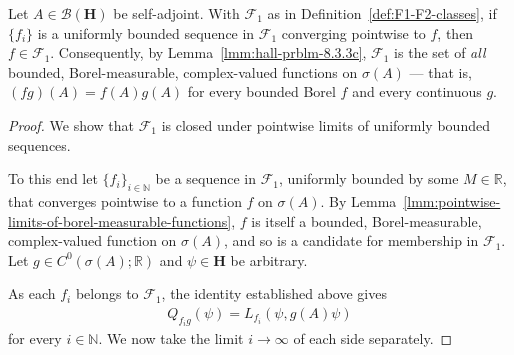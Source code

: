 \begin{proposition}
    \label{prpstn:F1-closed-under-limits}
    \leanok
    Let $A \in \mathcal{B}(\mathbf{H})$ be self-adjoint. With $\mathcal{F}_1$ as in Definition~\ref{def:F1-F2-classes}, if $\{f_i\}$ is a uniformly bounded sequence in $\mathcal{F}_1$ converging pointwise to $f$, then $f \in \mathcal{F}_1$. Consequently, by Lemma~\ref{lmm:hall-prblm-8.3.3c}, $\mathcal{F}_1$ is the set of \textit{all} bounded, Borel-measurable, complex-valued functions on $\sigma(A)$ — that is, $(fg)(A) = f(A)g(A)$ for every bounded Borel $f$ and every continuous $g$.
\end{proposition}
\begin{proof}
    \leanok
We show that $\mathcal{F}_1$ is closed under pointwise limits of uniformly bounded sequences.

To this end let $\{ f_i \}_{i \in \mathbb{N}}$ be a sequence in $\mathcal{F}_1$, uniformly bounded by some $M \in \mathbb{R}$, that converges pointwise to a function $f$ on $\sigma(A)$. By Lemma~\ref{lmm:pointwise-limits-of-borel-measurable-functions}, $f$ is itself a bounded, Borel-measurable, complex-valued function on $\sigma(A)$, and so is a candidate for membership in $\mathcal{F}_1$. Let $g \in C^0(\sigma(A); \mathbb{R})$ and $\psi \in \mathbf{H}$ be arbitrary.

As each $f_i$ belongs to $\mathcal{F}_1$, the identity established above gives
\begin{align}
    Q_{f_i g}(\psi) = L_{f_i}(\psi, g(A)\psi)
\end{align}
for every $i \in \mathbb{N}$. We now take the limit $i \rightarrow \infty$ of each side separately.


\end{proof}
